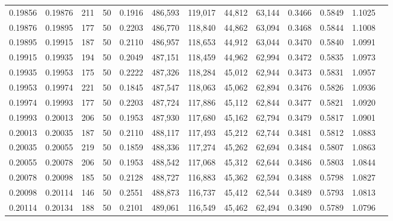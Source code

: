 \begin{tabular}{rrrrrrrrrrrrr}
0.19856 & 0.19876 &   211 &  50 &                                     0.1916 & 486,593 & 119,017 &  44,812 &  63,144 & 0.3466 & 0.5849 & 1.1025 \\
0.19876 & 0.19895 &   177 &  50 &                                     0.2203 & 486,770 & 118,840 &  44,862 &  63,094 & 0.3468 & 0.5844 & 1.1008 \\
0.19895 & 0.19915 &   187 &  50 &                                     0.2110 & 486,957 & 118,653 &  44,912 &  63,044 & 0.3470 & 0.5840 & 1.0991 \\
0.19915 & 0.19935 &   194 &  50 &                                     0.2049 & 487,151 & 118,459 &  44,962 &  62,994 & 0.3472 & 0.5835 & 1.0973 \\
0.19935 & 0.19953 &   175 &  50 &                                     0.2222 & 487,326 & 118,284 &  45,012 &  62,944 & 0.3473 & 0.5831 & 1.0957 \\
0.19953 & 0.19974 &   221 &  50 &                                     0.1845 & 487,547 & 118,063 &  45,062 &  62,894 & 0.3476 & 0.5826 & 1.0936 \\
0.19974 & 0.19993 &   177 &  50 &                                     0.2203 & 487,724 & 117,886 &  45,112 &  62,844 & 0.3477 & 0.5821 & 1.0920 \\
0.19993 & 0.20013 &   206 &  50 &                                     0.1953 & 487,930 & 117,680 &  45,162 &  62,794 & 0.3479 & 0.5817 & 1.0901 \\
0.20013 & 0.20035 &   187 &  50 &                                     0.2110 & 488,117 & 117,493 &  45,212 &  62,744 & 0.3481 & 0.5812 & 1.0883 \\
0.20035 & 0.20055 &   219 &  50 &                                     0.1859 & 488,336 & 117,274 &  45,262 &  62,694 & 0.3484 & 0.5807 & 1.0863 \\
0.20055 & 0.20078 &   206 &  50 &                                     0.1953 & 488,542 & 117,068 &  45,312 &  62,644 & 0.3486 & 0.5803 & 1.0844 \\
0.20078 & 0.20098 &   185 &  50 &                                     0.2128 & 488,727 & 116,883 &  45,362 &  62,594 & 0.3488 & 0.5798 & 1.0827 \\
0.20098 & 0.20114 &   146 &  50 &                                     0.2551 & 488,873 & 116,737 &  45,412 &  62,544 & 0.3489 & 0.5793 & 1.0813 \\
0.20114 & 0.20134 &   188 &  50 &                                     0.2101 & 489,061 & 116,549 &  45,462 &  62,494 & 0.3490 & 0.5789 & 1.0796 \\

\end{tabular}
